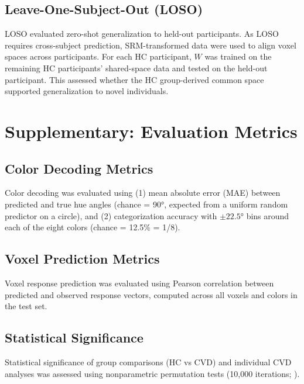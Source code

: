 \documentclass[a4paper,11pt]{article}
\begin{document}
\subsection*{Leave-One-Subject-Out (LOSO)}

LOSO evaluated zero-shot generalization to held-out participants. As LOSO requires cross-subject prediction, SRM-transformed data were used to align voxel spaces across participants. For each HC participant, $W$ was trained on the remaining HC participants' shared-space data and tested on the held-out participant. This assessed whether the HC group-derived common space supported generalization to novel individuals.



\section*{Supplementary: Evaluation Metrics}

\subsection*{Color Decoding Metrics}

Color decoding was evaluated using (1) mean absolute error (MAE) between predicted and true hue angles (chance = 90°, expected from a uniform random predictor on a circle), and (2) categorization accuracy with $\pm 22.5$° bins around each of the eight colors (chance = 12.5\% = 1/8).

\subsection*{Voxel Prediction Metrics}

Voxel response prediction was evaluated using Pearson correlation between predicted and observed response vectors, computed across all voxels and colors in the test set.

\subsection*{Statistical Significance}

Statistical significance of group comparisons (HC vs CVD) and individual CVD analyses was assessed using nonparametric permutation tests (10,000 iterations; ).


\end{document}
